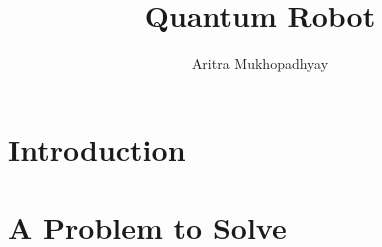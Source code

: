 \documentclass[12pt]{article}
\title{Quantum Robot}
\author{Aritra Mukhopadhyay}
\date{} %
\begin{document}
    

    

    \pagebreak
    \tableofcontents
    
    \pagebreak
    \section{Introduction}
    
    
    \section{A Problem to Solve}
    
    
    
    
    
    
    \pagebreak %
    
    
\end{document}
